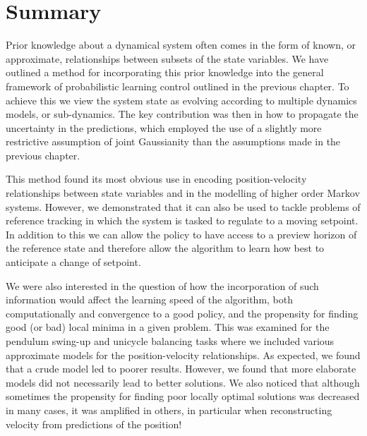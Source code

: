 





\section{Summary}
Prior knowledge about a dynamical system often comes in the form of known, or approximate, relationships between subsets of the state variables. We have outlined a method for incorporating this prior knowledge into the general framework of probabilistic learning control outlined in the previous chapter. To achieve this we view the system state as evolving according to multiple dynamics models, or sub-dynamics. The key contribution was then in how to propagate the uncertainty in the predictions, which employed the use of a slightly more restrictive assumption of joint Gaussianity than the assumptions made in the previous chapter.

This method found its most obvious use in encoding position-velocity relationships between state variables and in the modelling of higher order Markov systems. However, we demonstrated that it can also be used to tackle problems of reference tracking in which the system is tasked to regulate to a moving setpoint. In addition to this we can allow the policy to have access to a preview horizon of the reference state and therefore allow the algorithm to learn how best to anticipate a change of setpoint.


We were also interested in the question of how the incorporation of such information would affect the learning speed of the algorithm, both computationally and convergence to a good policy, and the propensity for finding good (or bad) local minima in a given problem. This was examined for the pendulum swing-up and unicycle balancing tasks where we included various approximate models for the position-velocity relationships. As expected, we found that a crude model led to poorer results. However, we found that more elaborate models did not necessarily lead to better solutions. We also noticed that although sometimes the propensity for finding poor locally optimal solutions was decreased in many cases, it was amplified in others, in particular when reconstructing velocity from predictions of the position!

